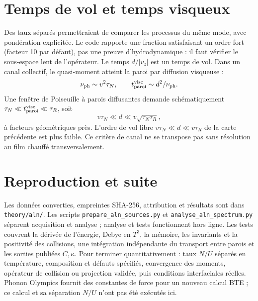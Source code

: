 \documentclass[11pt,a4paper]{article}
\begin{document}
\section{Temps de vol et temps visqueux}
Des taux séparés permettraient de comparer les processus du même mode, avec pondération explicitée. Le code rapporte une fraction satisfaisant un ordre fort (facteur 10 par défaut), pas une preuve d'hydrodynamique : il faut vérifier le sous-espace lent de l'opérateur.
Le temps $d/|v_z|$ est un temps de vol. Dans un canal collectif, le quasi-moment atteint la paroi par diffusion visqueuse :
\[\nu_{\rm ph}\sim v^2\tau_N,\qquad t_{\rm paroi}^{\rm visc}\sim d^2/\nu_{\rm ph}.\]
Une fenêtre de Poiseuille à parois diffusantes demande schématiquement $\tau_N\ll t_{\rm paroi}^{\rm visc}\ll\tau_R$, soit
\[v\tau_N\ll d\ll v\sqrt{\tau_N\tau_R},\]
à facteurs géométriques près. L'ordre de vol libre $v\tau_N\ll d\ll v\tau_R$ de la carte précédente est plus faible. Ce critère de canal ne se transpose pas sans résolution au film chauffé transversalement.
\section{Reproduction et suite}
Les données converties, empreintes SHA-256, attribution et résultats sont dans \texttt{theory/aln/}. Les scripts \texttt{prepare\_aln\_sources.py} et \texttt{analyse\_aln\_spectrum.py} séparent acquisition et analyse ; analyse et tests fonctionnent hors ligne. Les tests couvrent la dérivée de l'énergie, Debye en $T^3$, la mémoire, les invariants et la positivité des collisions, une intégration indépendante du transport entre parois et les sorties publiées $C,\kappa$.
Pour terminer quantitativement : taux $N/U$ séparés en température, composition et défauts spécifiés, convergence des moments, opérateur de collision ou projection validée, puis conditions interfaciales réelles. Phonon Olympics fournit des constantes de force pour un nouveau calcul BTE ; ce calcul et sa séparation $N/U$ n'ont pas été exécutés ici.
\end{document}
